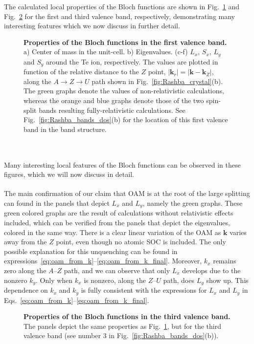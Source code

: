 The calculated local properties of the Bloch functions are shown in Fig.~\ref{fig:Rashba_oamvseigvalv1} and Fig.~\ref{fig:Rashba_oamvseigvalv2} for the first and third valence band, respectively, demonstrating many interesting features which we now discuss in further detail.
\begin{figure}
	\centering
{}
\caption{\label{fig:Rashba_oamvseigvalv1}{\bf Properties of the Bloch functions in the first valence band.} a) Center of mass in the unit-cell. b) Eigenvalues. (c-f) $L_x$, $S_x$, $L_y$ and $S_y$ around the Te ion, respectively. The values are plotted in function of the relative distance to the $Z$ point, $|\bm{k}_r| = |\bm{k} - \bm{k}_Z|$, along the $A \rightarrow Z \rightarrow U$ path shown in Fig.~\ref{fig:Rashba_crystal}(b). The green graphs denote the values of non-relativistic calculations, whereas the orange and blue graphs denote those of the two spin-split bands resulting fully-relativistic calculations. See Fig.~\ref{fig:Rashba_bands_dos}(b) for the location of this first valence band in the band structure.}
\end{figure}
\\\\
Many interesting local features of the Bloch functions can be observed in these figures, which we will now discuss in detail.
\\\\
The main confirmation of our claim that OAM is at the root of the large splitting can found in the panels that depict $L_x$ and $L_y$, namely the green graphs. These green colored graphs are the result of calculations without relativistic effects included, which can be verified from the panels that depict the eigenvalues, colored in the same way.
There is a clear linear variation of the OAM as $\bm k$ varies away from the $Z$ point, even though no atomic SOC is included.
The only possible explanation for this unquenching can be found in expressions~\eqref{eq:oam_from_k}--\eqref{eq:oam_from_k_final}.
Moreover, $k_x$ remains zero along the $A$--$Z$ path, and we can observe that only $L_x$ develops due to the nonzero $k_y$. Only when $k_x$ is nonzero, along the $Z$--$U$ path, does $L_y$ show up. This dependence on $k_x$ and $k_y$ is fully consistent with the expressions for $L_x$ and $L_y$ in Eqs.~\eqref{eq:oam_from_k}--\eqref{eq:oam_from_k_final}.
\begin{figure}
	\centering
{}
\caption{\label{fig:Rashba_oamvseigvalv2}{\bf Properties of the Bloch functions in the third valence band.} The panels depict the same properties as Fig.~\ref{fig:Rashba_oamvseigvalv1}, but for the third valence band (see number 3 in Fig.~\ref{fig:Rashba_bands_dos}(b)).}
\end{figure}
